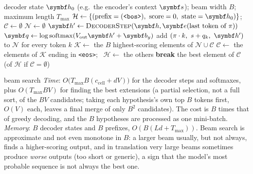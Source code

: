\documentclass[11pt]{article}
\newcommand{\hv}{\vect{h}}
\newcommand{\bv}{\vect{b}}
\newcommand{\ev}{\vect{e}}
\newcommand{\softmax}{\operatorname{softmax}}
\newcommand{\bos}{\texttt{<bos>}}
\newcommand{\eos}{\texttt{<eos>}}
\begin{document}
\begin{algorithm}[htbp]
\caption{Beam search decoding}\label{alg:beam}
\begin{algorithmic}[1]
\Require decoder state $\hv_0$ (e.g.\ the encoder's context $\vect{s}$); beam width $B$; maximum length $T_{\max}$
\Function{BeamSearch}{$\hv_0$}
  \State $\mathcal{H} \gets \{(\text{prefix} = (\bos),\ \text{score} = 0,\ \text{state} = \hv_0)\}$; \ $\mathcal{C} \gets \emptyset$
    \State $\mathcal{N} \gets \emptyset$
    \For{each $(\pi, s, \hv) \in \mathcal{H}$}
      \State $\hv' \gets \textsc{DecoderStep}(\hv, \ev(\text{last token of } \pi))$ 
      \State $\vect{q} \gets \log\softmax(V_{\mathrm{out}}\hv' + \bv_y)$ 
      \State add $(\pi \cdot k,\ s + q_k,\ \hv')$ to $\mathcal{N}$ for every token $k$ 
    \EndFor
    \State $\mathcal{K} \gets$ the $B$ highest-scoring elements of $\mathcal{N} \cup \mathcal{C}$
    \State $\mathcal{C} \gets$ the elements of $\mathcal{K}$ ending in \eos; \ $\mathcal{H} \gets$ the others
     \textbf{break}  \EndIf
  \EndFor
  \State \Return the best element of $\mathcal{C}$ (of $\mathcal{H}$ if $\mathcal{C} = \emptyset$) 
\EndFunction
\end{algorithmic}
\end{algorithm}

\begin{runtime}{beam search}
\emph{Time}: $O\big(T_{\max}B(c_{\mathrm{cell}} + dV)\big)$ for the decoder steps and softmaxes, plus $O(T_{\max}BV)$ for
finding the best extensions (a partial selection, not a full sort, of the $BV$ candidates; taking each hypothesis's own
top $B$ tokens first, $O(V)$ each, leaves a final merge of only $B^2$ candidates). The cost is $B$ times that of greedy decoding, and
the $B$ hypotheses are processed as one mini-batch. \emph{Memory}: $B$ decoder states and $B$ prefixes, $O(B(Ld + T_{\max}))$.
Beam search is approximate and not even monotone in $B$: a larger beam usually, but not always, finds a higher-scoring
output, and in translation very large beams sometimes produce \emph{worse} outputs (too short or generic), a sign that the
model's most probable sequence is not always the best one.
\end{runtime}
\end{document}
